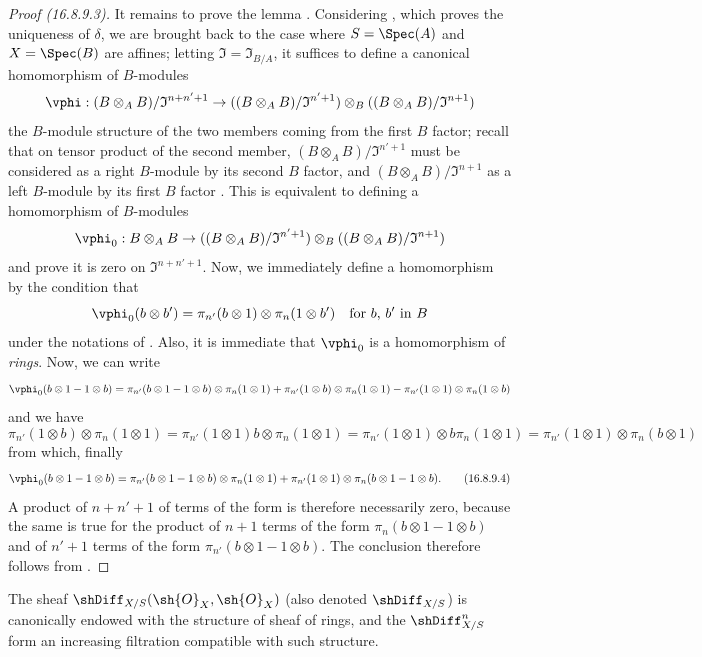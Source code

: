 \begin{proof}[Proof (16.8.9.3)]
It remains to prove the lemma .
Considering , which proves the uniqueness of $\delta$, we are brought back to the case where $S = \Spec(A)$ and $X = \Spec(B)$ are affines;
letting $\mathfrak{I} = \mathfrak{I}_{B/A}$, it suffices to define a canonical homomorphism of $B$-modules
\[
  \vphi: (B \otimes_A B)/\mathfrak{I}^{n+n'+1} \to ((B \otimes_A B)/\mathfrak{I}^{n' + 1}) \otimes_B ((B \otimes_A B)/\mathfrak{I}^{n + 1})
\]
the $B$-module structure of the two members coming from the first $B$ factor;
recall that on tensor product of the second member, $(B \otimes_A B)/\mathfrak{I}^{n' + 1}$ must be considered
as a right $B$-module by its second $B$ factor, and $(B \otimes_A B)/\mathfrak{I}^{n + 1}$ as a left $B$-module by its first $B$ factor .
This is equivalent to defining a homomorphism of $B$-modules
\[
  \vphi_0: B \otimes_A B \to ((B \otimes_A B)/\mathfrak{I}^{n' + 1}) \otimes_B ((B \otimes_A B)/\mathfrak{I}^{n + 1})
\]
and prove it is zero on $\mathfrak{I}^{n+n'+1}$.
Now, we immediately define a homomorphism by the condition that
\[
  \vphi_0(b \otimes b') = \pi_{n'}(b \otimes 1) \otimes \pi_n(1 \otimes b') \quad \text{for $b$, $b'$ in $B$}
\]
under the notations of .
Also, it is immediate that $\vphi_0$ is a homomorphism of \emph{rings}.
Now, we can write 
\[
  \vphi_0(b \otimes 1 - 1 \otimes b) = \pi_{n'}(b \otimes 1 - 1 \otimes b) \otimes \pi_n(1 \otimes 1) + \pi_{n'}(1 \otimes b) \otimes \pi_n(1 \otimes 1) - \pi_{n'}(1 \otimes 1) \otimes \pi_n(1 \otimes b)
\]
and we have 
\[
  \pi_{n'}(1 \otimes b) \otimes \pi_n(1 \otimes 1) = \pi_{n'}(1 \otimes 1) b \otimes \pi_n(1 \otimes 1) = \pi_{n'}(1 \otimes 1) \otimes b \pi_n(1 \otimes 1) = \pi_{n'}(1 \otimes 1) \otimes \pi_n(b \otimes 1)
\]
from which, finally
\[
  \label{IV.16.8.9.4}
  \vphi_0(b \otimes 1 - 1 \otimes b) = \pi_{n'}(b \otimes 1 - 1 \otimes b) \otimes \pi_n(1 \otimes 1) + \pi_{n'}(1 \otimes 1) \otimes \pi_n(b \otimes 1 - 1 \otimes b). 
  \tag{16.8.9.4}
\]
A product of $n + n' + 1$ of terms of the form  is therefore necessarily zero, because the same is true for the product of $n+1$ terms of the form $\pi_n(b \otimes 1 - 1 \otimes b)$ and of $n' + 1$ terms of the form $\pi_{n'}(b \otimes 1 - 1 \otimes b)$.
The conclusion therefore follows from .
\end{proof}

\begin{corollary}[16.8.10]
\label{IV.16.8.10}
The sheaf $\shDiff_{X/S}(\sh{O}_X, \sh{O}_X)$ (also denoted $\shDiff_{X/S}$) is canonically endowed with the structure of sheaf of rings, and the $\shDiff_{X/S}^n$ form an increasing filtration compatible with such structure.
\end{corollary}

